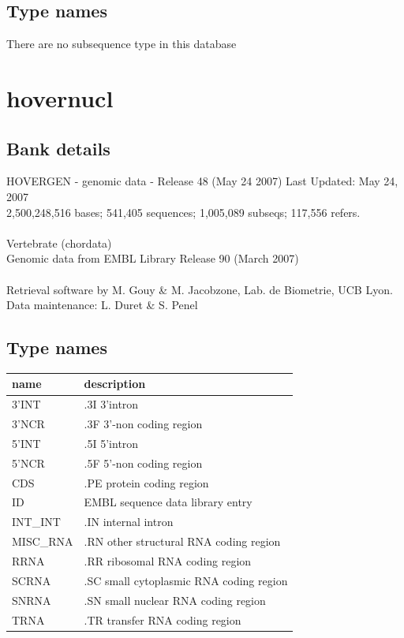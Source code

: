 \documentclass{article}
\begin{document}
\begin{Schunk}
\subsection{Type names}
There are no subsequence type in this database
\section{ hovernucl }
\subsection{Bank details}
HOVERGEN - genomic data - Release 48 (May 24 2007) Last Updated: May 24, 2007\\
2,500,248,516 bases; 541,405 sequences; 1,005,089 subseqs; 117,556 refers.\\
\\
Vertebrate (chordata)\\
Genomic data from EMBL Library Release 90 (March 2007)\\
\\
Retrieval software by M. Gouy \& M. Jacobzone, Lab. de Biometrie, UCB Lyon.\\
Data maintenance: L. Duret \& S. Penel\\


\subsection{Type names}
\noindent\begin{tabular}{ll}
\hline \hline
name & description\\
\hline
3'INT & .3I 3'intron \\
3'NCR & .3F  3'-non coding region \\
5'INT & .5I 5'intron \\
5'NCR & .5F  5'-non coding region \\
CDS & .PE protein coding region \\
ID & EMBL sequence data library entry \\
INT\_INT & .IN  internal intron \\
MISC\_RNA & .RN other structural RNA coding region \\
RRNA & .RR ribosomal RNA coding region \\
SCRNA & .SC small cytoplasmic RNA coding region \\
SNRNA & .SN small nuclear RNA coding region \\
TRNA & .TR transfer RNA coding region \\
\hline \hline
\end{tabular}


\end{Schunk}
\end{document}
